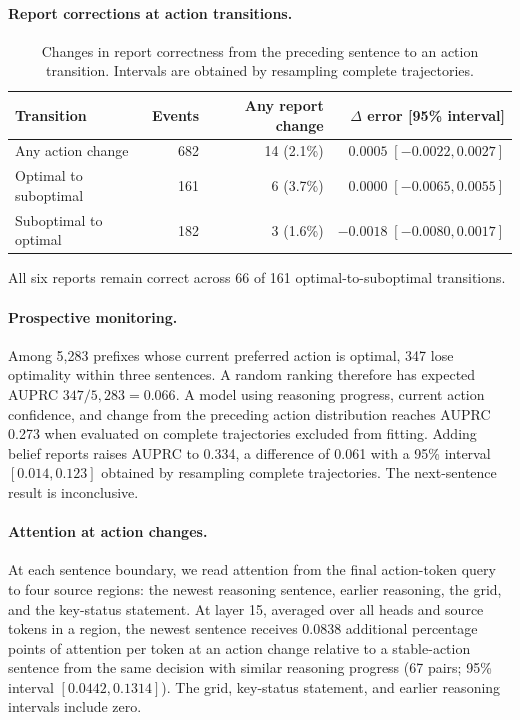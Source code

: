 \documentclass{article}
\begin{document}
\paragraph{Report corrections at action transitions.}
\begin{table}[t]
\centering\small
\begin{tabular}{lrrr}
\toprule
Transition & Events & Any report change & $\Delta$ error [95\% interval] \\
\midrule
Any action change & 682 & 14 (2.1\%) & $0.0005\;[-0.0022,0.0027]$ \\
Optimal to suboptimal & 161 & 6 (3.7\%) & $0.0000\;[-0.0065,0.0055]$ \\
Suboptimal to optimal & 182 & 3 (1.6\%) & $-0.0018\;[-0.0080,0.0017]$ \\
\bottomrule
\end{tabular}
\caption{Changes in report correctness from the preceding sentence to an action transition. Intervals are obtained by resampling complete trajectories.}\label{tab:belief-action-transitions}
\end{table}
All six reports remain correct across 66 of 161 optimal-to-suboptimal transitions.

\paragraph{Prospective monitoring.}
Among 5,283 prefixes whose current preferred action is optimal, 347 lose optimality within three sentences. A random ranking therefore has expected AUPRC $347/5{,}283=0.066$. A model using reasoning progress, current action confidence, and change from the preceding action distribution reaches AUPRC 0.273 when evaluated on complete trajectories excluded from fitting. Adding belief reports raises AUPRC to 0.334, a difference of 0.061 with a 95\% interval $[0.014,0.123]$ obtained by resampling complete trajectories. The next-sentence result is inconclusive.

\paragraph{Attention at action changes.}
At each sentence boundary, we read attention from the final action-token query to four source regions: the newest reasoning sentence, earlier reasoning, the grid, and the key-status statement. At layer 15, averaged over all heads and source tokens in a region, the newest sentence receives 0.0838 additional percentage points of attention per token at an action change relative to a stable-action sentence from the same decision with similar reasoning progress (67 pairs; 95\% interval $[0.0442,0.1314]$). The grid, key-status statement, and earlier reasoning intervals include zero.
\end{document}
